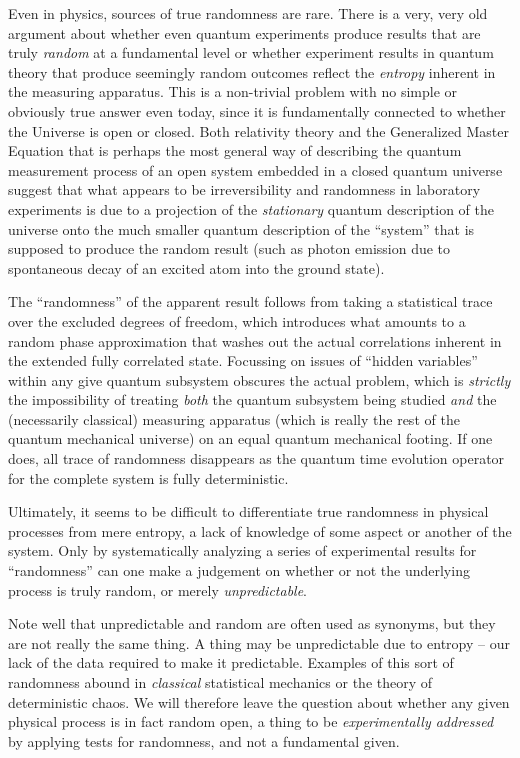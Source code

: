 \documentclass[12pt]{article}
\begin{document}
Even in physics, sources of true randomness are rare.  There is a very,
very old argument about whether even quantum experiments produce results
that are truly {\em random} at a fundamental level or whether experiment
results in quantum theory that produce seemingly random outcomes reflect
the {\em entropy} inherent in the measuring apparatus.  This is a
non-trivial problem with no simple or obviously true answer even today,
since it is fundamentally connected to whether the Universe is open or
closed.  Both relativity theory and the Generalized Master Equation that
is perhaps the most general way of describing the quantum measurement
process of an open system embedded in a closed quantum universe suggest
that what appears to be irreversibility and randomness in laboratory
experiments is due to a projection of the {\em stationary} quantum
description of the universe onto the much smaller quantum description of
the ``system'' that is supposed to produce the random result (such as
photon emission due to spontaneous decay of an excited atom into the
ground state).  

The ``randomness'' of the apparent result follows from taking a
statistical trace over the excluded degrees of freedom, which introduces
what amounts to a random phase approximation that washes out the actual
correlations inherent in the extended fully correlated state.  Focussing
on issues of ``hidden variables'' within any give quantum subsystem
obscures the actual problem, which is {\em strictly} the impossibility
of treating {\em both} the quantum subsystem being studied {\em and} the
(necessarily classical) measuring apparatus (which is really the rest of
the quantum mechanical universe) on an equal quantum mechanical footing.
If one does, all trace of randomness disappears as the quantum time
evolution operator for the complete system is fully deterministic.

Ultimately, it seems to be difficult to differentiate true randomness in
physical processes from mere entropy, a lack of knowledge of some aspect
or another of the system.  Only by systematically analyzing a series of
experimental results for ``randomness'' can one make a judgement on
whether or not the underlying process is truly random, or merely {\em
unpredictable}.  

Note well that unpredictable and random are often used as synonyms, but
they are not really the same thing.  A thing may be unpredictable due to
entropy -- our lack of the data required to make it predictable.
Examples of this sort of randomness abound in {\em classical}
statistical mechanics or the theory of deterministic chaos.  We will
therefore leave the question about whether any given physical process is
in fact random open, a thing to be {\em experimentally addressed} by
applying tests for randomness, and not a fundamental given.
\end{document}
